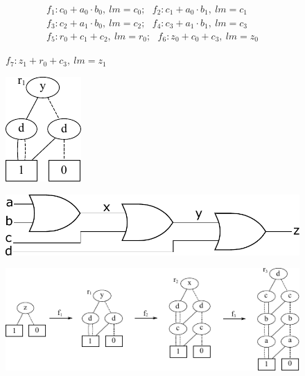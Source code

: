 \documentclass[journal, onecolumn]{IEEEtran}
\begin{document}
\begin{figure}[p]
\begin{align*}
f_1: c_0+a_0 \cdot b_0, \ lm=c_0; ~~~f_2: c_1+a_0 \cdot b_1, \ lm=c_1 \nonumber \\
f_3: c_2+a_1 \cdot b_0, \ lm=c_2; ~~~f_4: c_3+a_1 \cdot b_1, \ lm=c_3 \nonumber \\
f_5: r_0+c_1 + c_2 , \ lm=r_0; ~~~f_6: z_0+c_0 + c_3, \ lm=z_0\nonumber
\end{align*}
\vspace{-0.35in}
\begin{center}
$f_7: z_1+r_0 + c_3, \ lm=z_1$ %
\end{center}
\caption{}
\label{fig:rel_prime_lt}
\end{figure}

\clearpage

\begin{figure}[p]
\centering
\includegraphics[scale=1]{../figures/r1_clean.pdf}
\label{r1}
\caption{}
\end{figure}

\clearpage

\begin{figure}[p]
\centering
\includegraphics[scale=0.40]{../figures/Chain_Or_Gates.pdf}
\label{ChainOrGate}
\caption{}
\end{figure}

\clearpage

\begin{figure}[p]
\centering
\includegraphics[scale=1.4]{../figures/red_steps.pdf}
\caption{}
\label{red_steps}
\end{figure}
\end{document}
